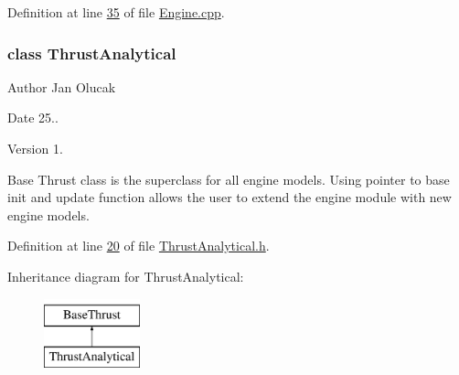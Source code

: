 Definition at line \hyperlink{_engine_8cpp_source_l00035}{35} of file \hyperlink{_engine_8cpp_source}{Engine.\+cpp}.

\label{class_thrust_analytical}
\subsubsection{class Thrust\+Analytical}
\begin{DoxyAuthor}{Author}
Jan Olucak 
\end{DoxyAuthor}
\begin{DoxyDate}{Date}
25.. 
\end{DoxyDate}
\begin{DoxyVersion}{Version}
1.
\end{DoxyVersion}
Base Thrust class is the superclass for all engine models. Using pointer to base init and update function allows the user to extend the engine module with new engine models. 

Definition at line \hyperlink{_thrust_analytical_8h_source_l00020}{20} of file \hyperlink{_thrust_analytical_8h_source}{Thrust\+Analytical.\+h}.

Inheritance diagram for Thrust\+Analytical\+:\begin{figure}[H]
\begin{center}
\leavevmode
\includegraphics[height=2.000000cm]{group___engine}
\end{center}
\end{figure}
